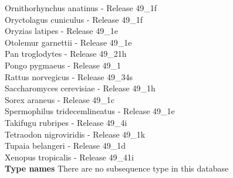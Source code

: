 \documentclass{article}
\begin{document}
\begin{Schunk}
 Ornithorhynchus anatinus - Release 49\_1f \\
 Oryctolagus cuniculus - Release 49\_1f \\
 Oryzias latipes - Release 49\_1e \\
 Otolemur garnettii - Release 49\_1e \\
 Pan troglodytes - Release 49\_21h \\
 Pongo pygmaeus - Release 49\_1 \\
 Rattus norvegicus - Release 49\_34s \\
 Saccharomyces cerevisiae - Release 49\_1h \\
 Sorex araneus - Release 49\_1c \\
 Spermophilus tridecemlineatus - Release 49\_1e \\
 Takifugu rubripes - Release 49\_4i \\
 Tetraodon nigroviridis - Release 49\_1k \\
 Tupaia belangeri - Release 49\_1d \\
 Xenopus tropicalis - Release 49\_41i \\


\textbf{Type names}
There are no subsequence type in this database

\end{Schunk}
\end{document}
